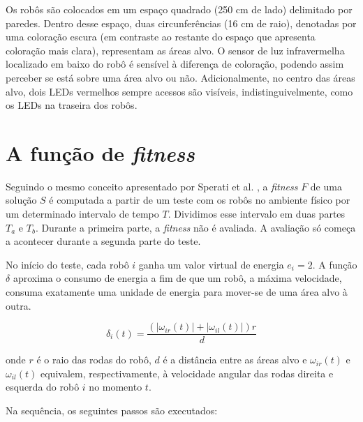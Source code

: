 Os robôs são colocados em um espaço quadrado (250 cm de lado) delimitado por paredes. Dentro desse espaço, duas circunferências (16 cm de raio), denotadas por uma coloração escura (em contraste ao restante do espaço que apresenta coloração mais clara), representam as áreas alvo. O sensor de luz infravermelha localizado em baixo do robô é sensível à diferença de coloração, podendo assim perceber se está sobre uma área alvo ou não. Adicionalmente, no centro das áreas alvo, dois LEDs vermelhos sempre acessos são visíveis, indistinguivelmente, como os LEDs na traseira dos robôs.

\section{A função de \textit{fitness}}
\label{sec:fitness}

Seguindo o mesmo conceito apresentado por Sperati et al. \cite{sperati2011path}, a \textit{fitness} $F$ de uma solução $S$ é computada a partir de um teste com os robôs no ambiente físico por um determinado intervalo de tempo $T$. Dividimos esse intervalo em duas partes $T_{a}$ e $T_{b}$. Durante a primeira parte, a \textit{fitness} não é avaliada. A avaliação só começa a acontecer durante a segunda parte do teste.

No início do teste, cada robô $i$ ganha um valor virtual de energia $e_{i} = 2$. A função $\delta$ aproxima o consumo de energia a fim de que um robô, a máxima velocidade, consuma exatamente uma unidade de energia para mover-se de uma área alvo à outra.

$$
\delta_{i} (t) = \frac{( | \omega_{ir} (t) | + | \omega_{il} (t) |) r}{d}
$$

onde $r$ é o raio das rodas do robô, $d$ é a distância entre as áreas alvo e $\omega_{ir} (t)$ e $\omega_{il} (t)$ equivalem, respectivamente, à velocidade angular das rodas direita e esquerda do robô $i$ no momento $t$.

Na sequência, os seguintes passos são executados:

